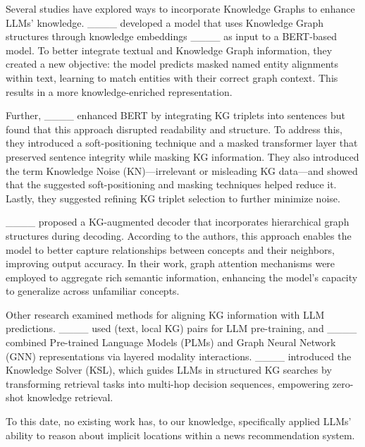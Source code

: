 Several studies have explored ways to incorporate Knowledge Graphs to enhance LLMs' knowledge. ____ developed a model that uses Knowledge Graph structures through knowledge embeddings ____ as input to a BERT-based model. To better integrate textual and Knowledge Graph information, they created a new objective: the model predicts masked named entity alignments within text, learning to match entities with their correct graph context. This results in a more knowledge-enriched representation.
    
Further, ____ enhanced BERT by integrating KG triplets into sentences but found that this approach disrupted readability and structure. To address this, they introduced a soft-positioning technique and a masked transformer layer that preserved sentence integrity while masking KG information. They also introduced the term Knowledge Noise (KN)—irrelevant or misleading KG data—and showed that the suggested soft-positioning and masking techniques helped reduce it. Lastly, they suggested refining KG triplet selection to further minimize noise.


____ proposed a KG-augmented decoder that incorporates hierarchical graph structures during decoding. According to the authors, this approach enables the model to better capture relationships between concepts and their neighbors, improving output accuracy. In their work, graph attention mechanisms were employed to aggregate rich semantic information, enhancing the model’s capacity to generalize across unfamiliar concepts.
   
Other research examined methods for aligning KG information with LLM predictions. ____ used (text, local KG) pairs for LLM pre-training, and ____ combined Pre-trained Language Models (PLMs) and Graph Neural Network (GNN) representations via layered modality interactions. ____ introduced the Knowledge Solver (KSL), which guides LLMs in structured KG searches by transforming retrieval tasks into multi-hop decision sequences, empowering zero-shot knowledge retrieval.
    
To this date, no existing work has, to our knowledge, specifically applied LLMs' ability to reason about implicit locations within a news recommendation system.